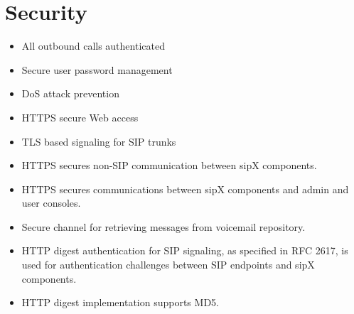\documentclass[letterpaper,10pt,english]{sphinxmanual}
\begin{document}
\section{Security}
\label{\detokenize{features:security}}\begin{itemize}
\item {} 
All outbound calls authenticated

\item {} 
Secure user password management

\item {} 
DoS attack prevention

\item {} 
HTTPS secure Web access

\item {} 
TLS based signaling for SIP trunks

\item {} 
HTTPS secures non-SIP communication between sipX components.

\item {} 
HTTPS secures communications between sipX components and admin and user consoles.

\item {} 
Secure channel for retrieving messages from voicemail repository.

\item {} 
HTTP digest authentication for SIP signaling, as specified in RFC 2617, is used for authentication challenges between SIP endpoints and sipX components.

\item {} 
HTTP digest implementation supports MD5.

\end{itemize}
\end{document}
